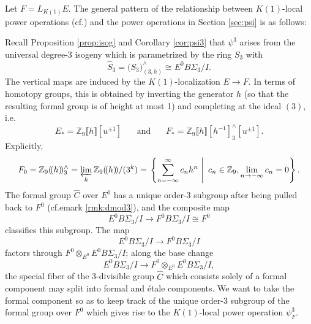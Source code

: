 \documentclass{gtpart}
\theoremstyle{definition}
\theoremstyle{remark}
\newcommand{\mb}[1]{\mathbb{#1}}
\newcommand{\cf}[1]{cf.\thinspace{\cite{#1}}}
\newcommand{\BZ}{{\mb Z}}
\newcommand{\HC}{\widehat{C}}
\newcommand{\HS}{\widehat{S}}
\newcommand{\p}{\psi^3}
\begin{document}
Let $F = L_{K(1)} E$.  The general pattern of the relationship between $K(1)$-local power operations (\cf{K(1)E_infty}) 
and the power operations in Section \ref{sec:psi} is as follows: 
\begin{center}
\end{center}
Recall Proposition \ref{prop:isog} and Corollary \ref{cor:psi3} that $\p$ arises from the universal degree-3 isogeny 
which is parametrized by the ring $S_3$ with 
\[
 \HS_3 = \big( S_3 \big)_{(3,h)}^\wedge \cong E^0 B\Sigma_3 / I.  
\]
The vertical maps are induced by the $K(1)$-localization $E \to F$.  In terms of 
homotopy groups, this is obtained by inverting the generator $h$ (so that 
the resulting formal group is of height at most 1) and completing at the ideal 
$(3)$, i.e. 
\[
 E_* = \BZ_9 \llbracket h \rrbracket [u^{\pm1}]~~~~~~~~\text{and}~~~~~~~~F_* = \BZ_9 \llbracket h \rrbracket [h^{-1}]_3^\wedge [u^{\pm1}].  
\]
Explicitly, 
\begin{equation}
\label{explicit}
 F_0 = \BZ_9 (\!(h)\!)_3^\wedge = \varprojlim_k \BZ_9 (\!(h)\!) /(3^k) = 
 \left.\left\{\sum_{n = -\infty}^{\infty} c_n h^n~\right|~c_n \in \BZ_9, 
 \lim_{n \to -\infty} c_n = 0\right\}.  
\end{equation}
The formal group $\HC$ over $E^0$ has a unique order-3 subgroup after being pulled back to $F^0$ (cf.emark \ref{rmk:dmod3}), 
and the composite map 
\[
 E^0 B\Sigma_3 / I \to F^0 B\Sigma_3 / I \cong F^0 
\]
classifies this subgroup.  
The map 
\[
 E^0 B\Sigma_3 / I \to F^0 B\Sigma_3 / I 
\]
factors through $F^0 \otimes_{E^0} E^0 B\Sigma_3 / I$; along the base change 
\[
 E^0 B\Sigma_3 / I \to F^0 \otimes_{E^0} E^0 B\Sigma_3 / I, 
\]
the special fiber of the 3-divisible group $\HC$ which consists solely of a formal component may split into formal and \'etale components.  
We want to take the formal component so as to keep track of the unique order-3 subgroup of the formal group over $F^0$ 
which gives rise to the $K(1)$-local power operation $\psi_F^3$.  
\end{document}
